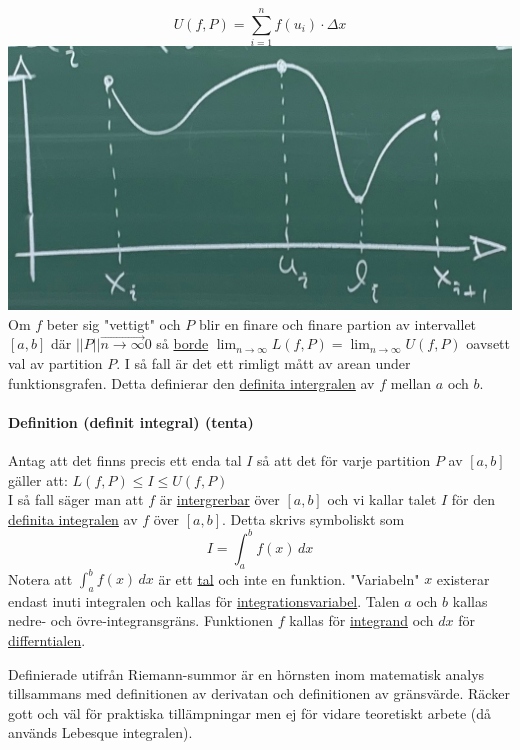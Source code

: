 \begin{equation*}
    U(f,P)=\sum_{i=1}^n f(u_i)\cdot\Delta x
\end{equation*}
\includegraphics[scale=0.1]{lessons/lesson14/imgs/img04.jpg}
Om $f$ beter sig "vettigt" och $P$ blir en finare och finare partion av intervallet $[a,b]$ där $||P||\overrightarrow{n\to\infty}0$ så \underline{borde} $\lim_{n\to\infty}L(f,P)=\lim_{n\to\infty}U(f,P)$ oavsett val av partition $P$.
I så fall är det ett rimligt mått av arean under funktionsgrafen.
Detta definierar den \underline{definita intergralen} av $f$ mellan $a$ och $b$.

\paragraph{Definition (definit integral) (tenta)} Antag att det finns precis ett enda tal $I$ så att det för varje partition $P$ av $[a,b]$ gäller att: $L(f,P)\leq I\leq U(f,P)$\\
I så fall säger man att $f$ är \underline{intergrerbar} över $[a,b]$ och vi kallar talet $I$ för den \underline{definita integralen} av $f$ över $[a,b]$.
Detta skrivs symboliskt som
\begin{equation*}
    I=\int_{a}^{b} f(x) \,dx
\end{equation*}
Notera att $\int_{a}^{b} f(x) \,dx$ är ett \underline{tal} och inte en funktion.
"Variabeln" $x$ existerar endast inuti integralen och kallas för \underline{integrationsvariabel}.
Talen $a$ och $b$ kallas nedre- och övre-integransgräns.
Funktionen $f$ kallas för \underline{integrand} och $dx$ för \underline{differntialen}.


Definierade utifrån Riemann-summor är en hörnsten inom matematisk analys tillsammans med definitionen av derivatan och definitionen av gränsvärde.
Räcker gott och väl för praktiska tillämpningar men ej för vidare teoretiskt arbete (då används Lebesque integralen).